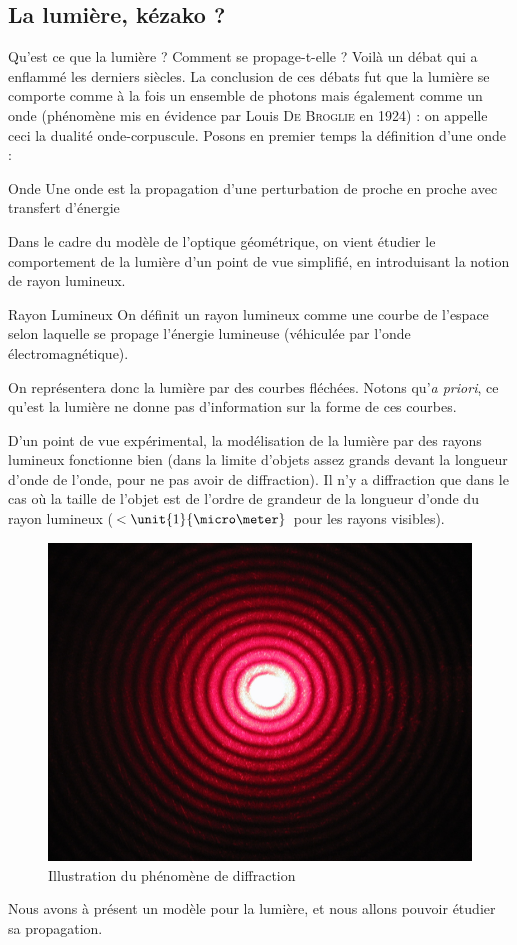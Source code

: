 \documentclass{classe}
\begin{document}
\subsection{La lumière, kézako ?}
Qu'est ce que la lumière ? Comment se propage-t-elle ? Voilà un débat qui a enflammé les derniers siècles. La conclusion de ces débats fut que la lumière se comporte comme à la fois un ensemble de photons mais également comme un onde (phénomène mis en évidence par Louis \textsc{De Broglie} en 1924) : on appelle ceci la dualité onde-corpuscule. Posons en premier temps la définition d'une onde :
\begin{définition}{Onde}{}
Une onde est la propagation d'une perturbation de proche en proche avec transfert d'énergie
\end{définition}
Dans le cadre du modèle de l'optique géométrique, on vient étudier le comportement de la lumière d'un point de vue simplifié, en introduisant la notion de rayon lumineux.
\begin{définition}{Rayon Lumineux}{}
On définit un rayon lumineux comme une courbe de l'espace selon laquelle se propage l'énergie lumineuse (véhiculée par l'onde électromagnétique).
\end{définition}
On représentera donc la lumière par des courbes fléchées.
Notons qu'\textit{a priori}, ce qu'est la lumière ne donne pas d'information sur la forme de ces courbes.
\begin{remarque}{}{}
	D'un point de vue expérimental, la modélisation de la lumière par des rayons lumineux fonctionne bien (dans la limite d'objets assez grands devant la longueur d'onde de l'onde, pour ne pas avoir de diffraction).
	Il n'y a diffraction que dans le cas où la taille de l'objet est de l'ordre de grandeur de la longueur d'onde du rayon lumineux ($<\unit{1}{\micro\meter}$ pour les rayons visibles).
\end{remarque}
\begin{figure}[H]
	\centering
	\includegraphics[scale=.08]{Diffraction.jpeg}
	\caption{Illustration du phénomène de diffraction}
\end{figure}
Nous avons à présent un modèle pour la lumière, et nous allons pouvoir étudier sa propagation.
\end{document}
